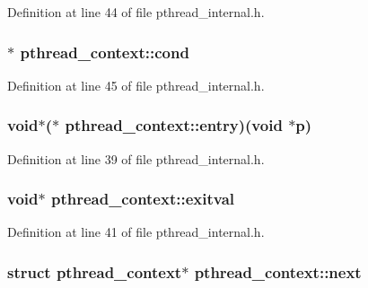 Definition at line 44 of file pthread\+\_\+internal.\+h.

\hypertarget{structpthread__context_ace03687a8a5dc35db9e23fdc96bf0667}{
\subsubsection[{cond}]{$\ast$ pthread\+\_\+context\+::cond}}\label{structpthread__context_ace03687a8a5dc35db9e23fdc96bf0667}


Definition at line 45 of file pthread\+\_\+internal.\+h.

\hypertarget{structpthread__context_a688eabe4cd81d34bed6c73abd442f54a}{
\subsubsection[{entry}]{\setlength{\rightskip}{0pt plus 5cm}void$\ast$($\ast$ pthread\+\_\+context\+::entry)(void $\ast$p)}}\label{structpthread__context_a688eabe4cd81d34bed6c73abd442f54a}


Definition at line 39 of file pthread\+\_\+internal.\+h.

\hypertarget{structpthread__context_ab2848ec5b075681f217e57545f986c1b}{
\subsubsection[{exitval}]{\setlength{\rightskip}{0pt plus 5cm}void$\ast$ pthread\+\_\+context\+::exitval}}\label{structpthread__context_ab2848ec5b075681f217e57545f986c1b}


Definition at line 41 of file pthread\+\_\+internal.\+h.

\hypertarget{structpthread__context_a876fe0d5cfa5b9886c90e5936b98f992}{
\subsubsection[{next}]{\setlength{\rightskip}{0pt plus 5cm}struct {\bf pthread\+\_\+context}$\ast$ pthread\+\_\+context\+::next}}\label{structpthread__context_a876fe0d5cfa5b9886c90e5936b98f992}


